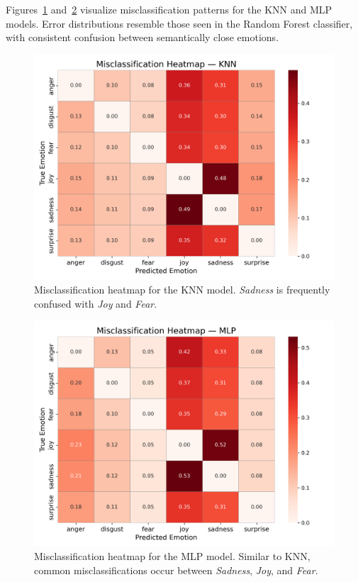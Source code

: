 \documentclass{article}
\begin{document}
Figures~\ref{fig:confusion_knn} and~\ref{fig:confusion_mlp} visualize misclassification patterns for the KNN and MLP models. Error distributions resemble those seen in the Random Forest classifier, with consistent confusion between semantically close emotions.

\begin{figure}[H]
\centering
\includegraphics[width=\textwidth]{Graphics/misclassification_heatmap_knn.png}
\caption{Misclassification heatmap for the KNN model. \textit{Sadness} is frequently confused with \textit{Joy} and \textit{Fear}.}
\label{fig:confusion_knn}
\end{figure}

\begin{figure}[H]
\centering
\includegraphics[width=\textwidth]{Graphics/misclassification_heatmap_mlp.png}
\caption{Misclassification heatmap for the MLP model. Similar to KNN, common misclassifications occur between \textit{Sadness}, \textit{Joy}, and \textit{Fear}.}
\label{fig:confusion_mlp}
\end{figure}
\end{document}
